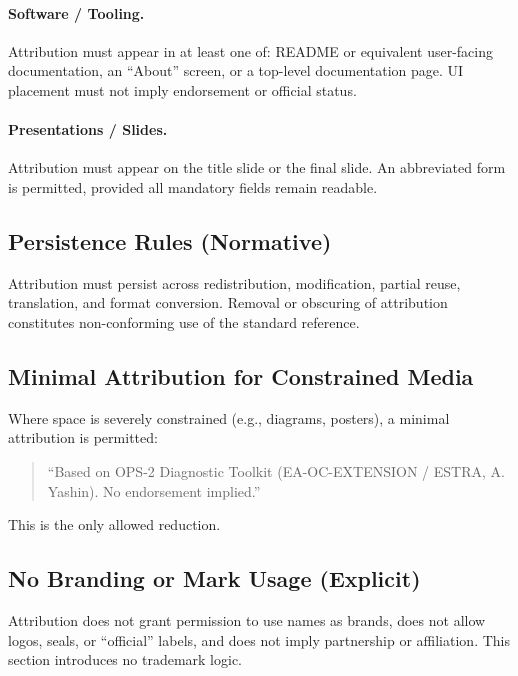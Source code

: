 \paragraph{Software / Tooling.}
Attribution must appear in at least one of: README or equivalent user-facing documentation, an ``About'' screen, or a top-level documentation page.
UI placement must not imply endorsement or official status.

\paragraph{Presentations / Slides.}
Attribution must appear on the title slide or the final slide.
An abbreviated form is permitted, provided all mandatory fields remain readable.

\subsection{Persistence Rules (Normative)}
Attribution must persist across redistribution, modification, partial reuse, translation, and format conversion.
Removal or obscuring of attribution constitutes non-conforming use of the standard reference.

\subsection{Minimal Attribution for Constrained Media}
Where space is severely constrained (e.g., diagrams, posters), a minimal attribution is permitted:
\begin{quote}
``Based on OPS-2 Diagnostic Toolkit (EA-OC-EXTENSION / ESTRA, A. Yashin). No endorsement implied.''
\end{quote}
This is the only allowed reduction.

\subsection{No Branding or Mark Usage (Explicit)}
Attribution does not grant permission to use names as brands, does not allow logos, seals, or ``official'' labels, and does not imply partnership or affiliation.
This section introduces no trademark logic.

